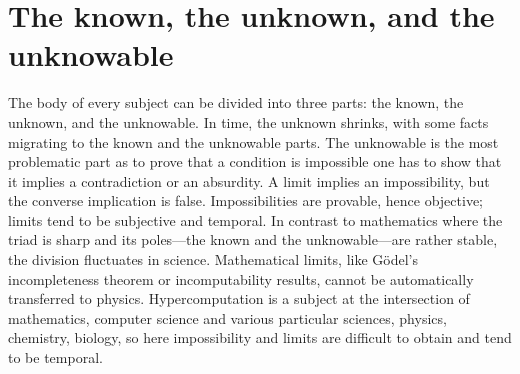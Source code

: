 \documentclass{comjnl}
\begin{document}
\section{The known, the unknown, and the unknowable}
The body of every subject can be divided into three parts: the known, the unknown, and the unknowable.
In time, the unknown shrinks, with some facts migrating to the known and the unknowable parts.
The unknowable is the most problematic part as to prove that a condition is impossible one has to show
that it implies a contradiction or an absurdity. A limit implies an impossibility, but the converse implication is false.
Impossibilities are provable, hence objective; limits tend to be subjective and temporal.
In contrast to mathematics where the triad is sharp and its poles---the known and the unknowable---are rather stable,
the division fluctuates in science. Mathematical limits, like G\"odel's incompleteness
theorem or incomputability results, cannot be automatically transferred to physics. Hypercomputation is
a subject at the intersection of mathematics, computer science and various particular sciences, physics, chemistry,
biology, so here impossibility and limits  are difficult to obtain and tend to be temporal.





\end{document}
